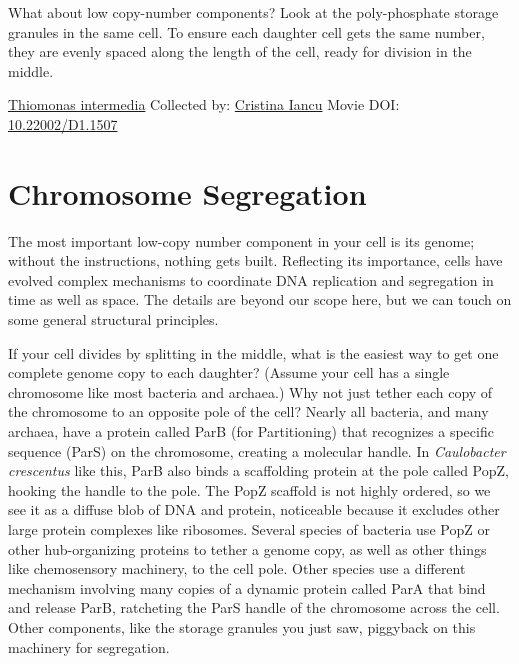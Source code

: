 \documentclass[]{tufte-book}
\begin{document}
What about low copy-number components? Look at the poly-phosphate storage granules in the same cell. To ensure each daughter cell gets the same number, they are evenly spaced along the length of the cell, ready for division in the middle.



\hypertarget{htmlwidget-27f66389a3815654adfb}{}

\label{fig:5-1}\protect\hyperlink{tree}{Thiomonas intermedia} Collected by: \protect\hyperlink{cristina_iancu}{Cristina Iancu} Movie DOI: \href{https://doi.org/10.22002/D1.1507}{10.22002/D1.1507}

\hypertarget{chromosome-segregation}{%
\section{Chromosome Segregation}\label{chromosome-segregation}}

The most important low-copy number component in your cell is its genome; without the instructions, nothing gets built. Reflecting its importance, cells have evolved complex mechanisms to coordinate DNA replication and segregation in time as well as space. The details are beyond our scope here, but we can touch on some general structural principles.

If your cell divides by splitting in the middle, what is the easiest way to get one complete genome copy to each daughter? (Assume your cell has a single chromosome like most bacteria and archaea.) Why not just tether each copy of the chromosome to an opposite pole of the cell? Nearly all bacteria, and many archaea, have a protein called ParB (for Partitioning) that recognizes a specific sequence (ParS) on the chromosome, creating a molecular handle. In \emph{Caulobacter crescentus} like this, ParB also binds a scaffolding protein at the pole called PopZ, hooking the handle to the pole. The PopZ scaffold is not highly ordered, so we see it as a diffuse blob of DNA and protein, noticeable because it excludes other large protein complexes like ribosomes. Several species of bacteria use PopZ or other hub-organizing proteins to tether a genome copy, as well as other things like chemosensory machinery, to the cell pole. Other species use a different mechanism involving many copies of a dynamic protein called ParA that bind and release ParB, ratcheting the ParS handle of the chromosome across the cell. Other components, like the storage granules you just saw, piggyback on this machinery for segregation.
\end{document}
